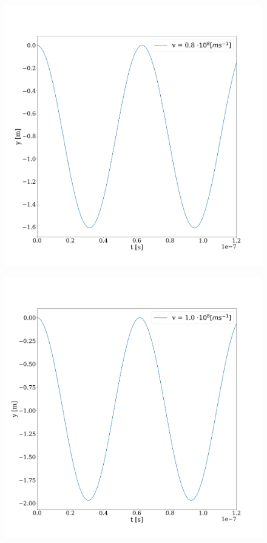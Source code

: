\documentclass[journal]{IEEEtran}
\begin{document}
\begin{figure}
    \centering
    \includegraphics[width=\linewidth]{freq_rel_4.png}
\end{figure}

\begin{figure}
    \centering
    \includegraphics[width=\linewidth]{freq_rel_5.png}
\end{figure}
\end{document}
